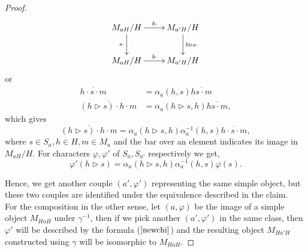 \documentclass[11pt]{book}
\theoremstyle{Rem}
\theoremstyle{definition}
\numberwithin{equation}{section}
\newcommand\hit{\triangleright}
\newcommand\inv{^{-1}}
\begin{document}
\begin{proof}
\[	\xymatrix{M_{aH}/H \ar[d]_{s\cdot} \ar[r]^{h\cdot} & M_{{a'H}}/H \ar[d]^{h\hit s\cdot} \\
	M_{aH}/H\ar[r]^{h\cdot} & M_{{a'H}}/H}
\] or \begin{align}
\overline{h\cdot s\cdot m} &= \alpha_a(h, s) \overline{hs\cdot m} \\
\overline{(h\hit s)\cdot h\cdot m} &= \alpha_a(h\hit s, h) \overline{hs\cdot m},
\end{align} which gives \begin{equation}
\overline{(h\hit s)\cdot h\cdot m} = 	\alpha_a(h\hit s, h)\alpha_a\inv(h, s) \overline{h\cdot s\cdot m},
\end{equation}where $s\in S_a, h\in H, m\in M_a$ and the bar over an element indicates its image in $M_{aH}/H$. For characters $\varphi, \varphi'$ of $S_a, S_{a'}$ respectively we get, \begin{equation}\label{newchi}
	\varphi'(h\hit s) = \alpha_a(h\hit s, h)\alpha_a\inv(h, s) \varphi(s).
\end{equation} 

Hence, we get another couple $(a', \varphi')$ representing the same simple object, but these two couples are identified under the equivalence described in  the claim. \\
For the composition in the other sense, let $(a, \varphi)$ be the image of a simple object $M_{HaH}$ under $\gamma\inv$, then if we pick another $(a', \varphi')$ in the same class, then $\varphi'$ will be described by the formula ($\ref{newchi}$) and the resulting object $M_{Ha'H}$ constructed using $\gamma$ will be isomorphic to  $M_{HaH}$.
\end{proof}
\end{document}
